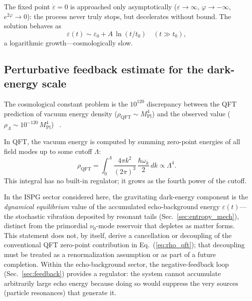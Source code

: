 \documentclass[aps,prd,onecolumn,superscriptaddress,nofootinbib,showpacs,12pt,notitlepage]{revtex4-2}
\begin{document}
The fixed point $\dot{\varepsilon} = 0$ is approached only
asymptotically ($\varepsilon \to \infty$, $\varphi \to -\infty$,
$e^{2\varphi} \to 0$): the process never truly stops, but
decelerates without bound.  The solution behaves as
\begin{equation}\label{eq:epsilon_late}
  \varepsilon(t) \sim \varepsilon_0 + A\,\ln(t/t_0)
  \quad (t \gg t_0),
\end{equation}
a logarithmic growth---cosmologically slow.

\subsection{Perturbative feedback estimate for the dark-energy scale}
\label{sec:cc_problem}

The cosmological constant problem is the $10^{120}$ discrepancy
between the QFT prediction of vacuum energy density
($\rho_{\mathrm{QFT}} \sim M_{\mathrm{Pl}}^4$) and the
observed value
($\rho_{\Lambda} \sim 10^{-120}\,M_{\mathrm{Pl}}^4$)~%
\cite{Weinberg1989,Martin2012}.

In QFT, the vacuum energy is computed by summing zero-point
energies of all field modes up to some cutoff $\Lambda$:
\begin{equation}\label{eq:rho_qft}
  \rho_{\mathrm{QFT}}
  = \int_0^{\Lambda} \frac{4\pi k^{2}}{(2\pi)^{3}}\,
    \frac{\hbar\omega_k}{2}\,dk
  \propto \Lambda^{4}.
\end{equation}
This integral has no built-in regulator; it grows as the
fourth power of the cutoff.

In the ISPG sector considered here, the gravitating dark-energy
component is the \emph{dynamical equilibrium} value of the
accumulated echo-background energy $\varepsilon(t)$---the stochastic
vibration deposited by resonant tails (Sec.~\ref{sec:entropy_mech}),
distinct from the primordial $\nu_0$-mode reservoir that depletes as
matter forms.  This statement does not, by itself, derive a
cancellation or decoupling of the conventional QFT zero-point
contribution in Eq.~(\ref{eq:rho_qft}); that decoupling must be
treated as a renormalization assumption or as part of a future
completion.  Within the echo-background sector, the negative-feedback
loop (Sec.~\ref{sec:feedback}) provides a regulator: the system cannot
accumulate arbitrarily large echo energy because doing so would
suppress the very sources (particle resonances) that generate it.
\end{document}
